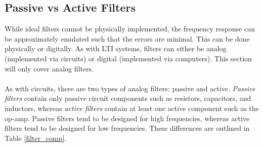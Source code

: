 \documentclass{report}
\begin{document}
\subsection{Passive vs Active Filters}
While ideal filters cannot be physically implemented, the frequency response can be approximately emulated such that the errors are minimal. This can be done physically or digitally. 
As with LTI systems, filters can either be analog (implemented via circuits) or digital (implemented via computers). This section will only cover analog filters.
\\ \\ 
As with circuits, there are two types of analog filters: passive and active. \emph{Passive filters} contain only passive circuit components such as resistors, capacitors, and inductors, whereas \emph{active filters} contain at least 
one active component such as the op-amp. Passive filters tend to be designed for high frequencies, whereas active filters tend to be designed for low frequencies. These differences are outlined in Table \ref{filter_comp}.
\begin{table}[!hbt]
    \centering
    \caption{Comparison of Passive and Active Filters}
    \label{filter_comp}
\end{table}
\end{document}
